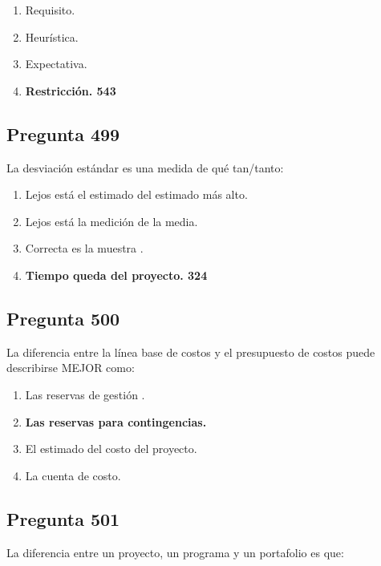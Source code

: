 \documentclass[11pt,a4paper]{article}
\begin{document}
\begin{enumerate}[label=\alph*)]
  \item Requisito.
  \item Heurística.
  \item Expectativa.
  \item \textbf{Restricción. 543}
\end{enumerate}

\subsection*{Pregunta 499}
La desviación estándar es una medida de qué tan/tanto:

\begin{enumerate}[label=\alph*)]
  \item Lejos está el estimado del estimado más alto.
  \item Lejos está la medición de la media.
  \item Correcta es la muestra .
  \item \textbf{Tiempo queda del proyecto. 324}
\end{enumerate}

\subsection*{Pregunta 500}
La diferencia entre la línea base de costos y el presupuesto de costos puede describirse MEJOR como:

\begin{enumerate}[label=\alph*)]
  \item Las reservas de gestión .
  \item \textbf{Las reservas para contingencias.}
  \item El estimado del costo del proyecto.
  \item La cuenta de costo.
\end{enumerate}

\subsection*{Pregunta 501}
La diferencia entre un proyecto, un programa y un portafolio es que:
\end{document}
